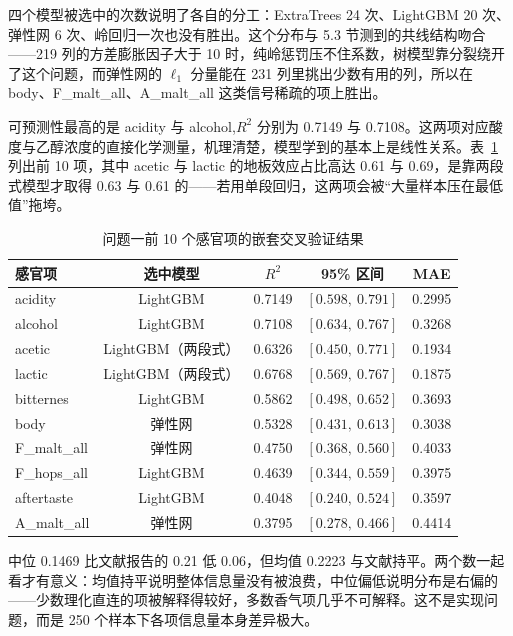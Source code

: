 四个模型被选中的次数说明了各自的分工：ExtraTrees 24 次、LightGBM 20 次、弹性网 6 次、岭回归一次也没有胜出。这个分布与 5.3 节测到的共线结构吻合——219 列的方差膨胀因子大于 10 时，纯岭惩罚压不住系数，树模型靠分裂绕开了这个问题，而弹性网的 $\ell_1$ 分量能在 231 列里挑出少数有用的列，所以在 body、F\_malt\_all、A\_malt\_all 这类信号稀疏的项上胜出。

可预测性最高的是 acidity 与 alcohol,$R^2$ 分别为 0.7149 与 0.7108。这两项对应酸度与乙醇浓度的直接化学测量，机理清楚，模型学到的基本上是线性关系。表~\ref{tab:q1} 列出前 10 项，其中 acetic 与 lactic 的地板效应占比高达 0.61 与 0.69，是靠两段式模型才取得 0.63 与 0.61 的——若用单段回归，这两项会被“大量样本压在最低值”拖垮。

\begin{table}[htbp]
\centering
\footnotesize
\caption{问题一前 10 个感官项的嵌套交叉验证结果}
\label{tab:q1}
\begin{tabular*}{\textwidth}{@{\extracolsep{\fill}}lcccc}
\toprule
\textbf{感官项} & \textbf{选中模型} & $R^2$ & \textbf{95\% 区间} & \textbf{MAE} \\
\midrule
acidity & LightGBM & 0.7149 & $[0.598,\ 0.791]$ & 0.2995 \\
alcohol & LightGBM & 0.7108 & $[0.634,\ 0.767]$ & 0.3268 \\
acetic & LightGBM（两段式） & 0.6326 & $[0.450,\ 0.771]$ & 0.1934 \\
lactic & LightGBM（两段式） & 0.6768 & $[0.569,\ 0.767]$ & 0.1875 \\
bitternes & LightGBM & 0.5862 & $[0.498,\ 0.652]$ & 0.3693 \\
body & 弹性网 & 0.5328 & $[0.431,\ 0.613]$ & 0.3038 \\
F\_malt\_all & 弹性网 & 0.4750 & $[0.368,\ 0.560]$ & 0.4033 \\
F\_hops\_all & LightGBM & 0.4639 & $[0.344,\ 0.559]$ & 0.3975 \\
aftertaste & LightGBM & 0.4048 & $[0.240,\ 0.524]$ & 0.3597 \\
A\_malt\_all & 弹性网 & 0.3795 & $[0.278,\ 0.466]$ & 0.4414 \\
\bottomrule
\end{tabular*}
\end{table}

中位 0.1469 比文献报告的 0.21 低 0.06，但均值 0.2223 与文献持平。两个数一起看才有意义：均值持平说明整体信息量没有被浪费，中位偏低说明分布是右偏的——少数理化直连的项被解释得较好，多数香气项几乎不可解释。这不是实现问题，而是 250 个样本下各项信息量本身差异极大。

